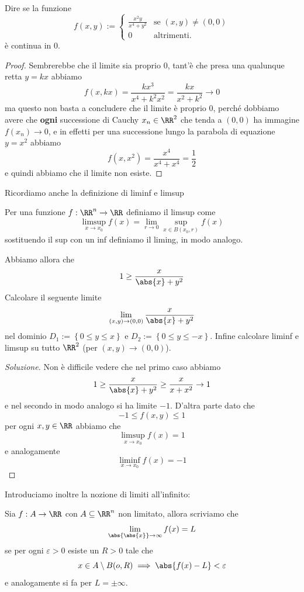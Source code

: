 \documentclass[11pt]{scrartcl}
\begin{document}
	\begin{exercise}
		Dire se la funzione
		$$f(x,y):=
		\begin{cases}
			\frac{x^2y}{x^4+y^2} & \text{se $(x,y)\ne (0,0)$} \\
			0 & \text{altrimenti.}
		\end{cases}
		$$
		è continua in $0$.
	\end{exercise}
	\begin{proof}
		Sembrerebbe che il limite sia proprio $0$, tant'è che presa una qualunque retta $y=kx$ abbiamo
		$$f(x,kx)=\frac{kx^3}{x^4+k^2x^2}=\frac{kx}{x^2+k^2}\to 0 $$
		ma questo non basta a concludere che il limite è proprio $0$, perché dobbiamo avere che \textbf{ogni} successione di Cauchy $x_n\in \RR^2$ che tenda a $(0,0)$ ha immagine $f(x_n)\to 0$, e in effetti per una successione lungo la parabola di equazione $y=x^2$ abbiamo
		$$f(x,x^2)=\frac{x^4}{x^4+x^4}=\frac{1}{2}$$
		e quindi abbiamo che il limite non esiste.
	\end{proof}
	Ricordiamo anche la definizione di liminf e limsup
	\begin{definition}
		Per una funzione $f:\RR^n\to \RR$ definiamo il limsup come
		$$\limsup_{x\to x_0}f(x)=\lim_{r\to 0}\sup_{x\in B(x_0,r)}f(x)$$
		sostituendo il sup con un inf definiamo il liming, in modo analogo.
	\end{definition}
	\begin{exercise}Abbiamo allora che
		$$1 \ge \frac{x}{\abs{x}+y^2}$$
		Calcolare il seguente limite
		$$\lim_{(x,y)\to(0,0)}\frac{x}{\abs{x}+y^2}$$
		nel dominio $D_1:=\left\{0\le y \le x\right\}$ e $D_2:=\left\{0 \le y \le -x\right\}$. Infine calcolare liminf e limsup su tutto $\RR^2$ (per $(x,y)\to (0,0)$).
	\end{exercise}
	\begin{proof}[Soluzione]
		Non è difficile vedere che nel primo caso abbiamo
		$$1\ge \frac{x}{\abs{x}+y^2}\ge \frac{x}{x+x^2}\to 1$$
		e nel secondo in modo analogo si ha limite $-1$. D'altra parte dato che
		$$-1\le f(x,y)\le 1$$
		per ogni $x,y\in \RR$ abbiamo che
		$$\limsup_{x\to x_0}f(x)=1$$
		e analogamente
		$$\liminf_{x\to x_0}f(x)=-1$$
	\end{proof}
	Introduciamo inoltre la nozione di limiti all'infinito:
	\begin{definition}
		Sia $f:A\to\RR$ con $A\subseteq \RR^n$ non limitato, allora scriviamo che 
		$$\lim_{\abs{\abs{x}}\to \infty}f(x)=L$$
		se per ogni $\varepsilon>0$ esiste un $R>0$ tale che 
		$$x\in A\setminus B(o,R) \implies \abs{f(x)-L}<\varepsilon$$
		e analogamente si fa per $L=\pm\infty$.
	\end{definition}
\end{document}
